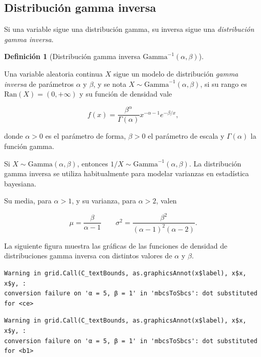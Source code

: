 \documentclass[
  spanish,
  a4paper,
]{scrreport}
\theoremstyle{plain}
\theoremstyle{definition}
\theoremstyle{definition}
\newtheorem{definition}{Definición}[chapter]
\theoremstyle{remark}
\begin{document}
\subsection{Distribución gamma
inversa}\label{distribuciuxf3n-gamma-inversa}

Si una variable sigue una distribución gamma, su inversa sigue una
\emph{distribución gamma inversa}.

\begin{definition}[Distribución gamma inversa
\(\mbox{Gamma}^{-1}(\alpha,\beta)\)]\protect\hypertarget{def-distribucion-gamma-inversa}{}\label{def-distribucion-gamma-inversa}

Una variable aleatoria continua \(X\) sigue un modelo de distribución
\emph{gamma inversa} de parámetros \(\alpha\) y \(\beta\), y se nota
\(X\sim \mbox{Gamma}^{-1}(\alpha,\beta)\), si su rango es
\(\mbox{Ran}(X)=(0,+\infty)\) y su función de densidad vale

\[
f(x) = \frac{\beta^{\alpha}}{\Gamma(\alpha)}x^{-\alpha-1}e^{-\beta/x},
\]

donde \(\alpha>0\) es el parámetro de forma, \(\beta>0\) el parámetro de
escala y \(\Gamma(\alpha)\) la función gamma.

\end{definition}

Si \(X\sim \mbox{Gamma}(\alpha, \beta)\), entonces
\(1/X\sim \mbox{Gamma}^{-1}(\alpha, \beta)\). La distribución gamma
inversa se utiliza habitualmente para modelar varianzas en estadística
bayesiana.

Su media, para \(\alpha>1\), y su varianza, para \(\alpha>2\), valen

\[
\mu = \frac{\beta}{\alpha-1} \qquad \sigma^2 = \frac{\beta^2}{(\alpha-1)^2(\alpha-2)}.
\]

La siguiente figura muestra las gráficas de las funciones de densidad de
distribuciones gamma inversa con distintos valores de \(\alpha\) y
\(\beta\).

\begin{verbatim}
Warning in grid.Call(C_textBounds, as.graphicsAnnot(x$label), x$x, x$y, :
conversion failure on 'α = 5, β = 1' in 'mbcsToSbcs': dot substituted for <ce>
\end{verbatim}

\begin{verbatim}
Warning in grid.Call(C_textBounds, as.graphicsAnnot(x$label), x$x, x$y, :
conversion failure on 'α = 5, β = 1' in 'mbcsToSbcs': dot substituted for <b1>
\end{verbatim}
\end{document}
